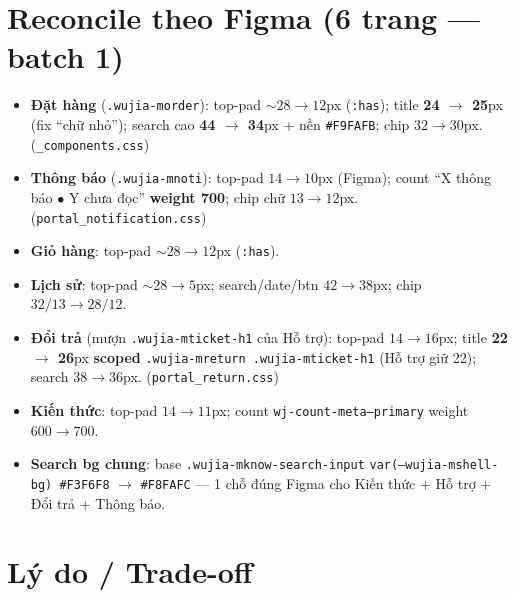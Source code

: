 \section{Reconcile theo Figma (6 trang --- batch 1)}

\begin{itemize}
  \item \textbf{Đặt hàng} (\texttt{.wujia-morder}): top-pad $\sim 28 \to 12$px (\texttt{:has}); title
        \textbf{24 $\to$ 25}px (fix ``chữ nhỏ''); search cao \textbf{44 $\to$ 34}px + nền \texttt{\#F9FAFB};
        chip $32 \to 30$px. (\texttt{\_components.css})
  \item \textbf{Thông báo} (\texttt{.wujia-mnoti}): top-pad $14 \to 10$px (Figma); count
        ``X thông báo $\bullet$ Y chưa đọc'' \textbf{weight 700}; chip chữ $13 \to 12$px.
        (\texttt{portal\_notification.css})
  \item \textbf{Giỏ hàng}: top-pad $\sim 28 \to 12$px (\texttt{:has}).
  \item \textbf{Lịch sử}: top-pad $\sim 28 \to 5$px; search/date/btn $42 \to 38$px; chip $32/13 \to 28/12$.
  \item \textbf{Đổi trả} (mượn \texttt{.wujia-mticket-h1} của Hỗ trợ): top-pad $14 \to 16$px; title
        \textbf{22 $\to$ 26}px \textbf{scoped} \texttt{.wujia-mreturn .wujia-mticket-h1} (Hỗ trợ giữ 22);
        search $38 \to 36$px. (\texttt{portal\_return.css})
  \item \textbf{Kiến thức}: top-pad $14 \to 11$px; count \texttt{wj-count-meta--primary} weight $600 \to 700$.
  \item \textbf{Search bg chung}: base \texttt{.wujia-mknow-search-input} \texttt{var(--wujia-mshell-bg)
        \#F3F6F8} $\to$ \texttt{\#F8FAFC} --- 1 chỗ đúng Figma cho Kiến thức + Hỗ trợ + Đổi trả + Thông báo.
\end{itemize}

\section{Lý do / Trade-off}

